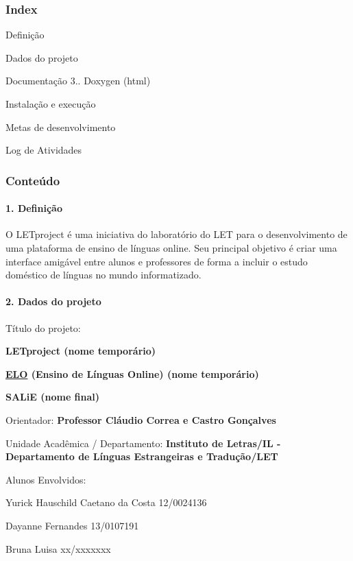 \subsubsection*{Index}


\begin{DoxyEnumerate}
\item Definição
\item Dados do projeto
\item Documentação 3.. Doxygen (html)
\item Instalação e execução
\item Metas de desenvolvimento
\item Log de Atividades
\end{DoxyEnumerate}

\subsubsection*{Conteúdo}

\paragraph*{1. Definição}

O L\-E\-Tproject é uma iniciativa do laboratório do L\-E\-T para o desenvolvimento de uma plataforma de ensino de línguas online. Seu principal objetivo é criar uma interface amigável entre alunos e professores de forma a incluir o estudo doméstico de línguas no mundo informatizado.

\paragraph*{2. Dados do projeto}

Título do projeto\-:
\begin{DoxyItemize}
\item {\bfseries L\-E\-Tproject (nome temporário)}
\item {\bfseries \hyperlink{namespaceELO}{E\-L\-O} (Ensino de Línguas Online) (nome temporário)}
\item {\bfseries S\-A\-Li\-E (nome final)}
\end{DoxyItemize}

Orientador\-: {\bfseries Professor Cláudio Correa e Castro Gonçalves}

Unidade Acadêmica / Departamento\-: {\bfseries Instituto de Letras/\-I\-L -\/ Departamento de Línguas Estrangeiras e Tradução/\-L\-E\-T}

Alunos Envolvidos\-:
\begin{DoxyItemize}
\item Yurick Hauschild Caetano da Costa 12/0024136
\item Dayanne Fernandes 13/0107191
\item Bruna Luisa xx/xxxxxxx
\end{DoxyItemize}

